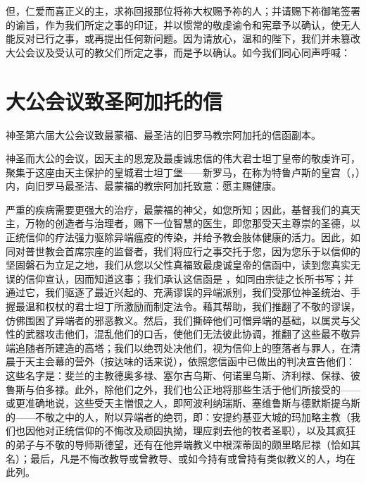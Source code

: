 但，仁爱而喜正义的主，求祢回报那位将祢大权赐予祢的人；并请赐下祢御笔签署的谕旨，作为我们所定之事的印证，并以惯常的敬虔谕令和宪章予以确认，使无人能反对已行之事，或再提出任何新问题。因为请放心，温和的陛下，我们并未篡改大公会议及受认可的教父们所定之事，而是予以确认。如今我们同心同声呼喊：\par

\par


\section{大公会议致圣阿加托的信}

神圣第六届大公会议致最蒙福、最圣洁的旧罗马教宗阿加托的信函副本。\par

神圣而大公的会议，因天主的恩宠及最虔诚忠信的伟大君士坦丁皇帝的敬虔许可，聚集于这座由天主保护的皇城君士坦丁堡——新罗马，在称为特鲁卢斯的皇宫（，）内，向旧罗马最圣洁、最蒙福的教宗阿加托致意：愿主赐健康。\par

严重的疾病需要更强大的治疗，最蒙福的神父，如您所知；因此，基督我们的真天主，万物的创造者与治理者，赐下一位智慧的医生，即您那受天主尊崇的圣德，以正统信仰的疗法强力驱除异端瘟疫的传染，并给予教会肢体健康的活力。因此，如同对普世教会首席宗座的监督者，我们将应行之事交托于您，因为您乐于以信仰的坚固磐石为立足之地，我们从您以父性真福致最虔诚皇帝的信函中，读到您真实无误的信仰宣认，因而知道这事；我们承认这信函是 ，如同由宗徒之长所书写；并通过它，我们驱逐了最近兴起的、充满谬误的异端派别，我们受那位神圣统治、手握最温和权杖的君士坦丁所激励而制定法令。藉其帮助，我们推翻了不敬的谬误，仿佛围困了异端者的邪恶教义。然后，我们撕碎他们可憎异端的基础，以属灵与父性的武器攻击他们，混乱他们的口舌，使他们无法彼此协调，推翻了这些最不敬异端追随者所建造的高塔；我们以绝罚处决他们，视为信仰上的堕落者与罪人，在清晨于天主会幕的营外（按达味的话来说），依照您信函中已做出的判决宣告他们：这些名字是：斐兰的主教德奥多禄、塞尔吉乌斯、何诺里乌斯、济利禄、保禄、彼鲁斯与伯多禄。此外，除他们之外，我们也公正地将那些生活于他们所接受的——或更准确地说，这些受天主憎恨之人，即阿波利纳瑞斯、塞维鲁斯与德默斯提乌斯的——不敬之中的人，附以异端者的绝罚，即：安提约基亚大城的玛加略主教（我们也因他对正统信仰的不悔改及顽固执拗，理应剥去他的牧者圣职），以及其疯狂的弟子与不敬的导师斯德望，还有在他异端教义中根深蒂固的颇里略尼禄（恰如其名）；最后，凡是不悔改教导或曾教导、或如今持有或曾持有类似教义的人，均在此列。\par

